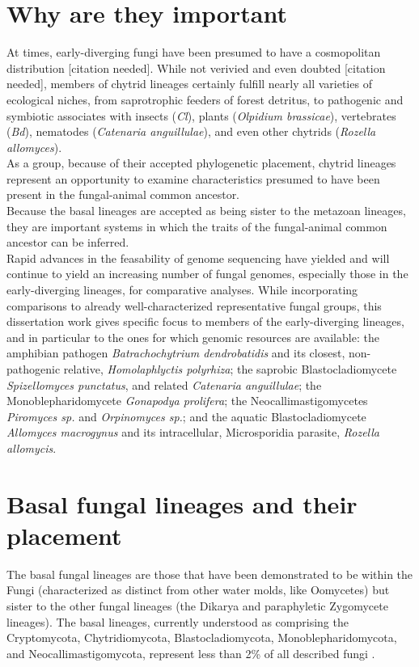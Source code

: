 \section{Why are they important}
At times, early-diverging fungi have been presumed to have a cosmopolitan distribution [citation needed]. While not verivied and even doubted [citation needed], members of chytrid lineages certainly fulfill nearly all varieties of ecological niches, from saprotrophic feeders of forest detritus, to pathogenic and symbiotic associates with insects (\textit{Cl}), plants (\textit{Olpidium brassicae}), vertebrates (\textit{Bd}), nematodes (\textit{Catenaria anguillulae}), and even other chytrids (\textit{Rozella allomyces}). \\
\indent As a group, because of their accepted phylogenetic placement, chytrid lineages represent an opportunity to examine characteristics presumed to have been present in the fungal-animal common ancestor. \\
\indent Because the basal lineages are accepted as being sister to the metazoan lineages, they are important systems in which the traits of the fungal-animal common ancestor can be inferred.\\
\indent Rapid advances in the feasability of genome sequencing have yielded and will continue to yield an increasing number of fungal genomes, especially those in the early-diverging lineages, for comparative analyses. While incorporating comparisons to already well-characterized representative fungal groups, this dissertation work gives specific focus to members of the early-diverging lineages, and in particular to the ones for which genomic resources are available: the amphibian pathogen \textit{Batrachochytrium dendrobatidis} and its closest, non-pathogenic relative, \textit{Homolaphlyctis polyrhiza}; the saprobic Blastocladiomycete \textit{Spizellomyces punctatus}, and related \textit{Catenaria anguillulae}; the Monoblepharidomycete \textit{Gonapodya prolifera}; the Neocallimastigomycetes \textit{Piromyces sp.} and \textit{Orpinomyces sp.}; and the aquatic Blastocladiomycete \textit{Allomyces macrogynus} and its intracellular, Microsporidia parasite, \textit{Rozella allomycis}.

\section{Basal fungal lineages and their placement}
\indent The basal fungal lineages are those that have been demonstrated to be within the Fungi (characterized as distinct from other water molds, like Oomycetes) but sister to the other fungal lineages (the Dikarya and paraphyletic Zygomycete lineages). The basal lineages, currently understood as comprising the Cryptomycota, Chytridiomycota, Blastocladiomycota, Monoblepharidomycota, and Neocallimastigomycota, represent less than 2\% of all described fungi \cite{Stajich2009}. 
